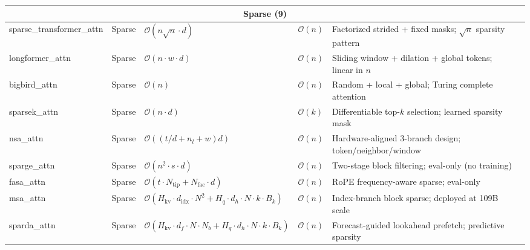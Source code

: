 \begin{longtable}{p{2.0cm}p{1.3cm}p{2.2cm}p{2.2cm}p{4.0cm}p{2.5cm}}
\multicolumn{6}{c}{\textbf{Sparse (9)}} \\
\midrule
sparse\_transformer\_attn & Sparse & $\mathcal{O}(n \sqrt{n} \cdot d)$ & $\mathcal{O}(n)$ & Factorized strided + fixed masks; $\sqrt{n}$ sparsity pattern & \citep{child_sparse_transformer_2019} \\
longformer\_attn & Sparse & $\mathcal{O}(n \cdot w \cdot d)$ & $\mathcal{O}(n)$ & Sliding window + dilation + global tokens; linear in $n$ & \citep{beltagy_longformer_2020} \\
bigbird\_attn & Sparse & $\mathcal{O}(n)$ & $\mathcal{O}(n)$ & Random + local + global; Turing complete attention & \citep{zaheer_bigbird_2020} \\
sparsek\_attn & Sparse & $\mathcal{O}(n \cdot d)$ & $\mathcal{O}(k)$ & Differentiable top-$k$ selection; learned sparsity mask & \citep{lou_sparsek_2024} \\
nsa\_attn & Sparse & $\mathcal{O}((t/d + n_l + w)d)$ & $\mathcal{O}(n)$ & Hardware-aligned 3-branch design; token/neighbor/window & \citep{yuan_nsa_2025} \\
sparge\_attn & Sparse & $\mathcal{O}(n^2 \cdot s \cdot d)$ & $\mathcal{O}(n)$ & Two-stage block filtering; eval-only (no training) & \citep{zhang_spargeattn_2025} \\
fasa\_attn & Sparse & $\mathcal{O}(t \cdot N_{\text{tip}} + N_{\text{fac}} \cdot d)$ & $\mathcal{O}(n)$ & RoPE frequency-aware sparse; eval-only & \citep{wang_fasa_2026} \\
msa\_attn & Sparse & $\mathcal{O}(H_{\text{kv}} \cdot d_{\text{idx}} \cdot N^2 + H_q \cdot d_h \cdot N \cdot k \cdot B_k)$ & $\mathcal{O}(n)$ & Index-branch block sparse; deployed at 109B scale & \citep{lai_minimax_2026} \\
sparda\_attn & Sparse & $\mathcal{O}(H_{\text{kv}} \cdot d_f \cdot N \cdot N_b + H_q \cdot d_h \cdot N \cdot k \cdot B_k)$ & $\mathcal{O}(n)$ & Forecast-guided lookahead prefetch; predictive sparsity & \citep{fu_sparda_2026} \\
\midrule


\end{longtable}
